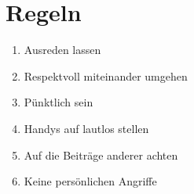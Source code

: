 \documentclass[fontsize=14pt]{mybib}
\author{OTS}
\begin{document}
\section{Regeln}
\begin{enumerate}
    \item Ausreden lassen
    \item Respektvoll miteinander umgehen
    \item Pünktlich sein
    \item Handys auf lautlos stellen
    \item Auf die Beiträge anderer achten
    \item Keine persönlichen Angriffe
\end{enumerate}
\end{document}
